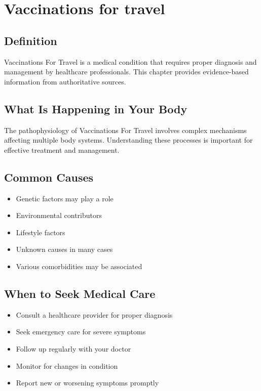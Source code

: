 
\chapter{Vaccinations for travel}

\section*{Definition}
Vaccinations For Travel is a medical condition that requires proper diagnosis and management by healthcare professionals. This chapter provides evidence-based information from authoritative sources.

\section*{What Is Happening in Your Body}
The pathophysiology of Vaccinations For Travel involves complex mechanisms affecting multiple body systems. Understanding these processes is important for effective treatment and management.

\section*{Common Causes}
\begin{itemize}
  \item Genetic factors may play a role
  \item Environmental contributors
  \item Lifestyle factors
  \item Unknown causes in many cases
  \item Various comorbidities may be associated
\end{itemize}

\section*{When to Seek Medical Care}
\begin{itemize}
  \item Consult a healthcare provider for proper diagnosis
  \item Seek emergency care for severe symptoms
  \item Follow up regularly with your doctor
  \item Monitor for changes in condition
  \item Report new or worsening symptoms promptly
\end{itemize}


